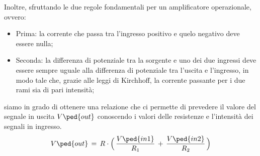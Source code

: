 Inoltre, sfruttando le due regole fondamentali per un amplificatore operazionale, ovvero:
\begin{itemize}
	\item{Prima: la corrente che passa tra l'ingresso positivo e quelo negativo deve essere nulla;}
	\item{Seconda: la differenza di potenziale tra la sorgente e uno dei due ingressi deve essere sempre uguale alla differenza di potenziale tra l'uscita e l'ingresso, in modo tale che, grazie alle leggi di Kirchhoff, la corrente passante per i due rami sia di pari intensità;}
\end{itemize}
siamo in grado di ottenere una relazione che ci permette di prevedere il valore del segnale in uscita $V\ped{out}$ conoscendo i valori delle resistenze e l'intensità dei segnali in ingresso.
\begin{equation}
	V\ped{out}\,=\,R\cdot \Bigl(\,\frac{V\ped{in1}}{R_1}\,+\,\frac{V\ped{in2}}{R_2}\,\Bigr)
\end{equation}










